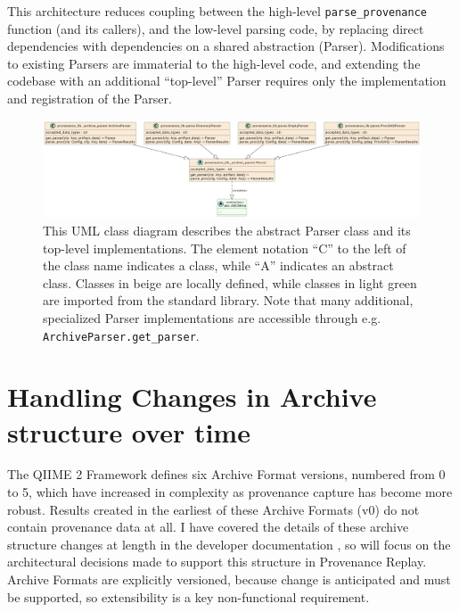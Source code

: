 This architecture reduces coupling between the high-level \texttt{parse\_provenance}
function (and its callers), and the low-level parsing code, by replacing direct
dependencies with dependencies on a shared abstraction (Parser). Modifications
to existing Parsers are immaterial to the high-level code, and extending the
codebase with an additional “top-level” Parser requires only the implementation
and registration of the Parser. 

\begin{figure}[htp]
\centering
\includegraphics[width=\textwidth]{figures/allParsersUML.png}
\caption[UML Class diagram of the abstract Parser class and its implementations]%
{This UML class diagram describes the abstract Parser class and its top-level
implementations. The element notation “C” to the left of the class name
indicates a class, while “A” indicates an abstract class. Classes in beige are
locally defined, while classes in light green are imported from the standard
library. Note that many additional, specialized Parser implementations are
accessible through e.g. \texttt{ArchiveParser.get\_parser}.}
\label{fig:allParsersUML}
\end{figure}


\section{Handling Changes in Archive structure over time}

The QIIME 2 Framework defines six Archive Format versions, numbered from 0 to 5,
which have increased in complexity as provenance capture has become more robust.
Results created in the earliest of these Archive Formats (v0) do not contain
provenance data at all. I have covered the details of these archive structure
changes at length in the developer documentation \parencite{qiime_2_development_team_archive_2018},
so will focus on the architectural decisions made to support this structure in
Provenance Replay.  Archive Formats are explicitly versioned, because change is
anticipated and must be supported, so extensibility is a key non-functional
requirement.

